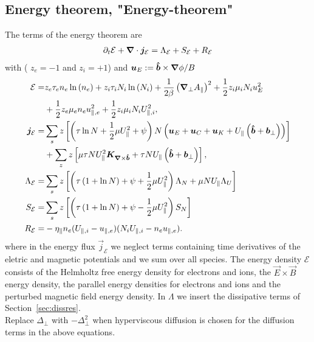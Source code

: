 \subsection{Energy theorem, "Energy-theorem"}
The terms of the energy theorem are
\begin{align} \label{eq:energy_theorem}
\partial_t \mathcal E +
{\boldsymbol{\nabla}}\cdot {\boldsymbol{j}}_{\mathcal E}
= \Lambda_{\mathcal E}
+  S_{\mathcal E}
+  R_{\mathcal E}
\end{align}
with ( $z_e=-1$ and $z_i=+1$) and ${\boldsymbol{u}}_E := {\bm{\hat{b}}\times {\boldsymbol{\nabla}}\phi}/{B}$
\begin{align} \label{eq:energy_conservation}
  \mathcal{E}= & z_e\tau_e n_e \ln{(n_e)} +z_i\tau_i N_i\ln{(N_i)}
  +\frac{1}{2\beta}\left({\boldsymbol{\nabla}}_{\perp} A_\parallel\right)^2
   +  \frac{1}{2} z_i \mu_i N_i u_E^2  \nonumber\\
   & +\frac{1}{2} z_e\mu_e  n_e u_{\parallel,e}^2
  +\frac{1}{2} z_i\mu_i  N_i U_{\parallel,i}^2,\\
  {\boldsymbol{j}}_{\mathcal E} =& \sum_s z\left[
  \left(\tau \ln N + \frac{1}{2}\mu U_\parallel^2 + \psi \right)N\left(
  {\boldsymbol{u}}_E + {\boldsymbol{u}}_C + {\boldsymbol{u}}_{K} +U_\parallel\left(\bm{\hat{b}}+{{\boldsymbol{b}}}_\perp\right)  \right) \right]
  \nonumber\\
  &+ \sum_z z\left[\mu \tau NU_\parallel^2{\boldsymbol{K}}_{{\boldsymbol{\nabla}}\times\bm{\hat{b}}} + \tau NU_\parallel \left(\bm{\hat{b}} + {{\boldsymbol{b}}}_\perp\right)\right], \\
  \Lambda_{\mathcal E} =&  \sum_s z\left[\left( \tau\left( 1+\ln{N}\right) + \psi + \frac{1}{2} \mu U_\parallel^2 \right)
  \Lambda_N  +  \mu NU_\parallel\Lambda_U  \right]
\nonumber \\
  S_{\mathcal E} =&  \sum_s  z\left[ \left(\tau\left( 1+\ln{N}\right) +\psi - \frac{1}{2} \mu U_\parallel^2 \right)S_{N}\right]
\nonumber \\
R_{\mathcal E} =&  -\eta_\parallel  n_e(U_{\parallel,i}-u_{\parallel,e})(N_iU_{\parallel,i} - n_eu_{\parallel,e}).
\end{align}
where in the energy flux $\vec j_{\mathcal E}$
we neglect terms  containing time derivatives
of the eletric and magnetic potentials and we sum over all species.
The energy density $\mathcal E$ consists of the Helmholtz free energy density for electrons and ions,
the \(\vec{E} \times \vec{B}\) energy density, the parallel energy densities for electrons and ions and the perturbed magnetic field energy density.
In \(\Lambda\) we insert the dissipative terms of Section~\ref{sec:dissres}. \\
Replace $\Delta_\perp$ with $-\Delta_\perp^2$ when hyperviscous diffusion is chosen
for the diffusion terms in the above equations.


